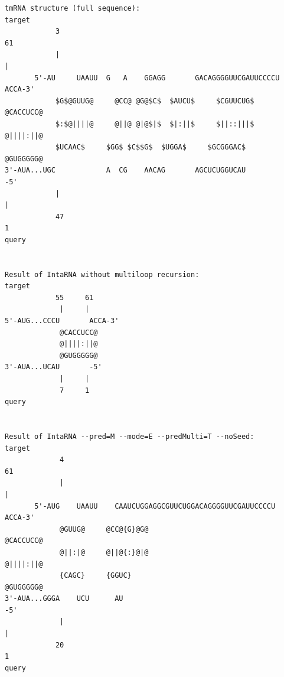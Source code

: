 \documentclass[11pt,a4paper]{report}
\begin{document}
\begin{landscape}
\begin{lstlisting}[style=special]
tmRNA structure (full sequence):
target
            3                                                          61
            |                                                          |
       5'-AU     UAAUU  G   A    GGAGG       GACAGGGGUUCGAUUCCCCU       ACCA-3'
            $G$@GUUG@     @CC@ @G@$C$  $AUCU$     $CGUUCUG$         	         @CACCUCC@
            $:$@||||@     @||@ @|@$|$  $|:||$     $||::|||$    	         @||||:||@
            $UCAAC$     $GG$ $C$$G$  $UGGA$     $GCGGGAC$    	         @GUGGGGG@
3'-AUA...UGC            A  CG    AACAG       AGCUCUGGUCAU               -5'
            |                                                          |
            47                                                         1
query


Result of IntaRNA without multiloop recursion:
target
            55     61
             |     |
5'-AUG...CCCU       ACCA-3'
             @CACCUCC@
             @||||:||@
             @GUGGGGG@
3'-AUA...UCAU       -5'
             |     |
             7     1
query


Result of IntaRNA --pred=M --mode=E --predMulti=T --noSeed:
target
             4                                                        61
             |                                                        |
       5'-AUG    UAAUU    CAAUCUGGAGGCGUUCUGGACAGGGGUUCGAUUCCCCU       ACCA-3'
             @GUUG@     @CC@{G}@G@                                      @CACCUCC@
             @||:|@     @||@{:}@|@                                      @||||:||@
             {CAGC}     {GGUC}                                      @GUGGGGG@
3'-AUA...GGGA    UCU      AU                                           -5'
             |                                                        |
            20                                                        1
query



\end{lstlisting}
\end{landscape}
\end{document}
